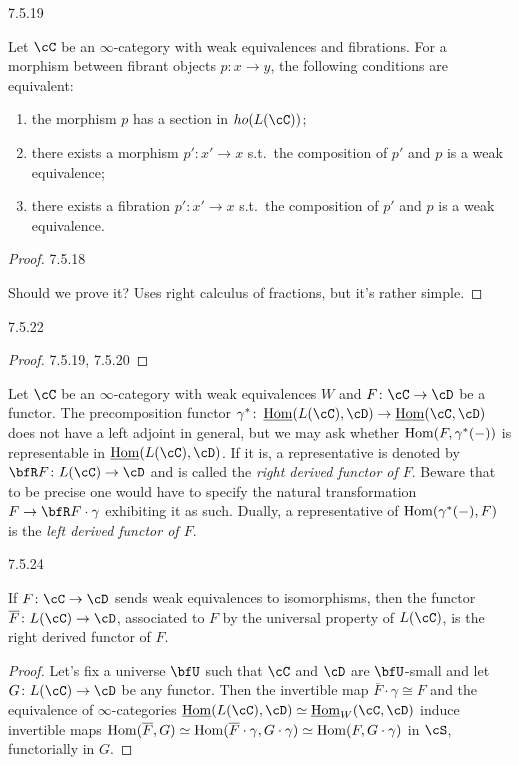 \documentclass[a4paper,12pt]{scrartcl}
\begin{document}
\begin{cor}
  7.5.19

  Let $\cC$ be an $\infty$-category with weak equivalences and fibrations. For a
  morphism between fibrant objects $p\colon x\rightarrow y$, the following
  conditions are equivalent:
  \begin{enumerate}
    \item the morphism $p$ has a section in $ho(L(\cC))$;
    \item there exists a morphism $p'\colon x'\rightarrow x$ s.t.\ the
      composition of $p'$ and $p$ is a weak equivalence;
    \item there exists a fibration $p'\colon x'\rightarrow x$ s.t.\ the
      composition of $p'$ and $p$ is a weak equivalence.
  \end{enumerate}
\end{cor}
\begin{proof}
  7.5.18

  Should we prove it? Uses right calculus of fractions, but it's rather simple.
\end{proof}

\begin{construction}\label{7522}
  7.5.22
\end{construction}
\begin{proof}
  7.5.19, 7.5.20
\end{proof}

\begin{rmk}
  Let $\cC$ be an $\infty$-category with weak equivalences $W$ and
  $F\colon\cC\rightarrow\cD$ be a functor. The precomposition functor
  $\gamma^*\colon\Home(L(\cC),\cD)\rightarrow\Home(\cC,\cD)$ does not have a
  left adjoint in general, but we may ask whether $\operatorname{Hom}(F,\gamma^*(-))$ is
  representable in $\Home(L(\cC),\cD)$. If it is, a representative is denoted by
  $\bfR F\colon L(\cC)\rightarrow\cD$ and is called the \emph{right derived
  functor of $F$}. Beware that to be precise one would have to specify the
  natural transformation $F\rightarrow\bfR F\cdot\gamma$ exhibiting it as such.
  Dually, a representative of $\operatorname{Hom}(\gamma^*(-),F)$ is the \emph{left derived
  functor of $F$}.
\end{rmk}

\begin{prop}\label{7524}
  7.5.24

  If $F\colon\cC\rightarrow\cD$ sends weak equivalences to isomorphisms, then
  the functor $\overline{F}\colon L(\cC)\rightarrow\cD$, associated to $F$ by
  the universal property of $L(\cC)$, is the right derived functor of $F$.
\end{prop}
\begin{proof}
  Let's fix a universe $\bfU$ such that $\cC$ and $\cD$ are $\bfU$-small and let
  $G\colon L(\cC)\rightarrow\cD$ be any functor. Then the invertible map
  $\overline{F}\cdot\gamma\cong F$ and the equivalence of $\infty$-categories
  $\Home(L(\cC),\cD)\simeq\Home_W(\cC,\cD)$ induce invertible maps
  $\operatorname{Hom}(\overline{F},G)\simeq\operatorname{Hom}(\overline{F}\cdot\gamma,G\cdot\gamma)\simeq\operatorname{Hom}(F,G\cdot\gamma)$
  in $\cS$, functorially in $G$.
\end{proof}
\end{document}
